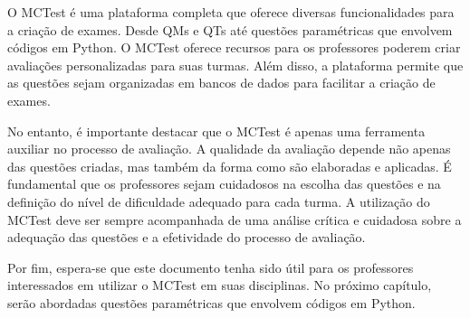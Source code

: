 O MCTest é uma plataforma completa que oferece diversas funcionalidades para a criação de exames. Desde QMs e QTs até questões paramétricas que envolvem códigos em Python. O MCTest oferece recursos para os professores poderem criar avaliações personalizadas para suas turmas. Além disso, a plataforma permite que as questões sejam organizadas em bancos de dados para facilitar a criação de exames.

No entanto, é importante destacar que o MCTest é apenas uma ferramenta auxiliar no processo de avaliação. A qualidade da avaliação depende não apenas das questões criadas, mas também da forma como são elaboradas e aplicadas. É fundamental que os professores sejam cuidadosos na escolha das questões e na definição do nível de dificuldade adequado para cada turma. A utilização do MCTest deve ser sempre acompanhada de uma análise crítica e cuidadosa sobre a adequação das questões e a efetividade do processo de avaliação.

Por fim, espera-se que este documento tenha sido útil para os professores interessados em utilizar o MCTest em suas disciplinas. No próximo capítulo, serão abordadas questões paramétricas que envolvem códigos em Python. 